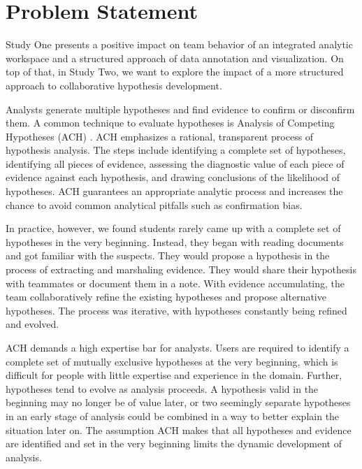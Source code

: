 \section{Problem Statement}

Study One presents a positive impact on team behavior of an integrated analytic workspace and a structured approach of data annotation and visualization. On top of that, in Study Two, we want to explore the impact of a more structured approach to collaborative hypothesis development. 

Analysts generate multiple hypotheses and find evidence to confirm or disconfirm them. A common technique to evaluate hypotheses is Analysis of Competing Hypotheses (ACH) \citep{Heuer1999}. ACH emphasizes a rational, transparent process of hypothesis analysis. The steps include identifying a complete set of hypotheses, identifying all pieces of evidence, assessing the diagnostic value of each piece of evidence against each hypothesis, and drawing conclusions of the likelihood of hypotheses. ACH guarantees an appropriate analytic process and increases the chance to avoid common analytical pitfalls such as confirmation bias.

In practice, however, we found students rarely came up with a complete set of hypotheses in the very beginning. Instead, they began with reading documents and got familiar with the suspects. They would propose a hypothesis in the process of extracting and marshaling evidence. They would share their hypothesis with teammates or document them in a note. With evidence accumulating, the team collaboratively refine the existing hypotheses and propose alternative hypotheses. The process was iterative, with hypotheses constantly being refined and evolved.

ACH demands a high expertise bar for analysts. Users are required to identify a complete set of mutually exclusive hypotheses at the very beginning, which is difficult for people with little expertise and experience in the domain. Further, hypotheses tend to evolve as analysis proceeds. A hypothesis valid in the beginning may no longer be of value later, or two seemingly separate hypotheses in an early stage of analysis could be combined in a way to better explain the situation later on. The assumption ACH makes that all hypotheses and evidence are identified and set in the very beginning limits the dynamic development of analysis.

